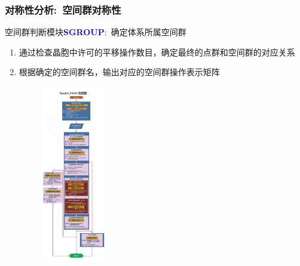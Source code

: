 \documentclass[cjk,slidestop,handout,compress,mathserif,blue]{beamer}	%
\begin{document}
%

\frame
{
	\frametitle{对称性分析:~空间群对称性}
\begin{minipage}[b]{0.52\linewidth}
	空间群判断模块\textcolor{blue}{\textbf{SGROUP}}:~确定体系所属空间群
	\begin{enumerate}
		\item 通过检查晶胞中许可的平移操作数目，确定最终的点群和空间群的对应关系\\
			{\fontsize{7.2pt}{4.2pt}\selectfont{(32点群-230空间群对应列表)}}
		\item 根据确定的空间群名，输出对应的空间群操作表示矩阵\\{\fontsize{7.2pt}{4.2pt}\selectfont{(点群矩阵+平移矢量)}}
	\end{enumerate}
\end{minipage}
\hfill
\begin{minipage}[b]{0.46\linewidth}
\begin{figure}[h!]
\centering
\vspace*{-0.2in}
\includegraphics[height=3.05in,width=1.55in,viewport=0 50 840 2255,clip]{Figures/VASP_sym-detail.png}
\label{Space_Symmetry}
\end{figure} 
\end{minipage}
}
\end{document}

